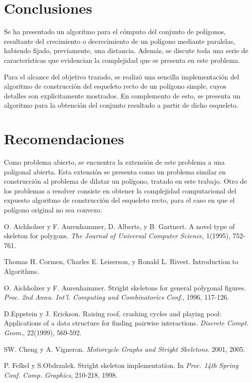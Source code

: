 \documentclass[12pt,english]{report}
\begin{document}

  

\setcounter{secnumdepth}{-1}
\chapter{Conclusiones}  

Se ha presentado un algoritmo para el c\'omputo del conjunto de pol\'igonos, resultante del crecimiento o decrecimiento de un pol\'igono mediante paralelas, habiendo fijado, previamente, una distancia. Adem\'as, se discute toda una serie de caracter\'isticas que evidencian la complejidad que se presenta en este problema.

Para el alcance del objetivo trazado, se realiz\'o una sencilla implementaci\'on del algoritmo de construcci\'on del esqueleto recto de un pol\'igono simple, cuyos detalles son expl\'icitamente mostrados. En complemento de esto, se presenta un algoritmo para la obtenci\'on del conjunto resultado a partir de dicho esqueleto.  

\chapter{Recomendaciones} 

Como problema abierto, se encuentra la extensi\'on de este problema a una poligonal abierta. Esta extensi\'on se presenta como un problema similar en construcci\'on al problema de dilatar un pol\'igono, tratado en este trabajo. Otro de los problemas a resolver consiste en obtener la complejidad computacional del expuesto algoritmo de construcci\'on del esqueleto recto, para el caso en que el pol\'igono original no sea convexo.

\begin{thebibliography}{9}

O. Aichholzer y F. Aurenhammer, D. Alberts, y B. Gartnert. A novel type of skeleton for polygons. \emph{The Journal of Universal Computer Science}, 1(1995), 752-761.%

Thomas H. Cormen, Charles E. Leiserson, y Ronald L. Rivest. Introduction to Algorithms.

O. Aichholzer y F. Aurenhammer. Stright skeletons for general polygonal figures. \emph{Proc. 2nd Annu. Int'l. Computing and Combinatorics Conf}., 1996, 117-126. 

D.Eppstein y J. Erickson. Raising roof, crashing cycles and playing pool: Applications of a data structure for finding pairwise interactions. \emph{Discrete Compt. Geom}., 22(1999), 569-592. 

SW. Cheng y A. Vigneron. \emph{Motorcycle Graphs and Stright Skeletons}. 2001, 2005.  

\bibitem{} P. Felkel y S.Obdrzalek. Stright skeleton implementation. In \emph{Proc. 14th Spring Conf. Comp. Graphics}, 210-218, 1998.  

\end{thebibliography}
\end{document}
